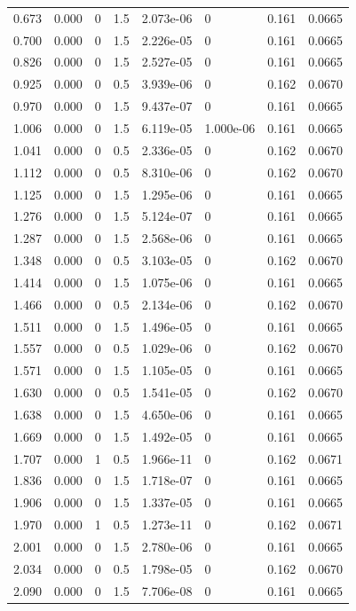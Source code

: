 \documentclass[preview]{standalone}
\begin{document}
{{\begin{tabular}{L{1.2cm}C{1.2cm} C{0.3cm}C{0.5cm} C{1.4cm}C{1.4cm} C{1.4cm}C{1.4cm}}
  0.673  &  0.000  & 0     & 1.5 &  2.073e-06  & 0  & 0.161 &  0.0665   \\ 
  0.700  &  0.000  & 0     & 1.5 &  2.226e-05  & 0  & 0.161 &  0.0665   \\ 
  0.826  &  0.000  & 0     & 1.5 &  2.527e-05  & 0  & 0.161 &  0.0665   \\ 
  0.925  &  0.000  & 0     & 0.5 &  3.939e-06  & 0  & 0.162 &  0.0670   \\ 
  0.970  &  0.000  & 0     & 1.5 &  9.437e-07  & 0  & 0.161 &  0.0665   \\ 
  1.006  &  0.000  & 0     & 1.5 &  6.119e-05  & 1.000e-06  & 0.161 &  0.0665   \\ 
  1.041  &  0.000  & 0     & 0.5 &  2.336e-05  & 0  & 0.162 &  0.0670   \\ 
  1.112  &  0.000  & 0     & 0.5 &  8.310e-06  & 0  & 0.162 &  0.0670   \\ 
  1.125  &  0.000  & 0     & 1.5 &  1.295e-06  & 0  & 0.161 &  0.0665   \\ 
  1.276  &  0.000  & 0     & 1.5 &  5.124e-07  & 0  & 0.161 &  0.0665   \\ 
  1.287  &  0.000  & 0     & 1.5 &  2.568e-06  & 0  & 0.161 &  0.0665   \\ 
  1.348  &  0.000  & 0     & 0.5 &  3.103e-05  & 0  & 0.162 &  0.0670   \\ 
  1.414  &  0.000  & 0     & 1.5 &  1.075e-06  & 0  & 0.161 &  0.0665   \\ 
  1.466  &  0.000  & 0     & 0.5 &  2.134e-06  & 0  & 0.162 &  0.0670   \\ 
  1.511  &  0.000  & 0     & 1.5 &  1.496e-05  & 0  & 0.161 &  0.0665   \\ 
  1.557  &  0.000  & 0     & 0.5 &  1.029e-06  & 0  & 0.162 &  0.0670   \\ 
  1.571  &  0.000  & 0     & 1.5 &  1.105e-05  & 0  & 0.161 &  0.0665   \\ 
  1.630  &  0.000  & 0     & 0.5 &  1.541e-05  & 0  & 0.162 &  0.0670   \\ 
  1.638  &  0.000  & 0     & 1.5 &  4.650e-06  & 0  & 0.161 &  0.0665   \\ 
  1.669  &  0.000  & 0     & 1.5 &  1.492e-05  & 0  & 0.161 &  0.0665   \\ 
  1.707  &  0.000  & 1     & 0.5 &  1.966e-11  & 0  & 0.162 &  0.0671   \\ 
  1.836  &  0.000  & 0     & 1.5 &  1.718e-07  & 0  & 0.161 &  0.0665   \\ 
  1.906  &  0.000  & 0     & 1.5 &  1.337e-05  & 0  & 0.161 &  0.0665   \\ 
  1.970  &  0.000  & 1     & 0.5 &  1.273e-11  & 0  & 0.162 &  0.0671   \\ 
  2.001  &  0.000  & 0     & 1.5 &  2.780e-06  & 0  & 0.161 &  0.0665   \\ 
  2.034  &  0.000  & 0     & 0.5 &  1.798e-05  & 0  & 0.162 &  0.0670   \\ 
  2.090  &  0.000  & 0     & 1.5 &  7.706e-08  & 0  & 0.161 &  0.0665   \\ 
\hline 
\end{tabular} 

}}
\end{document}
